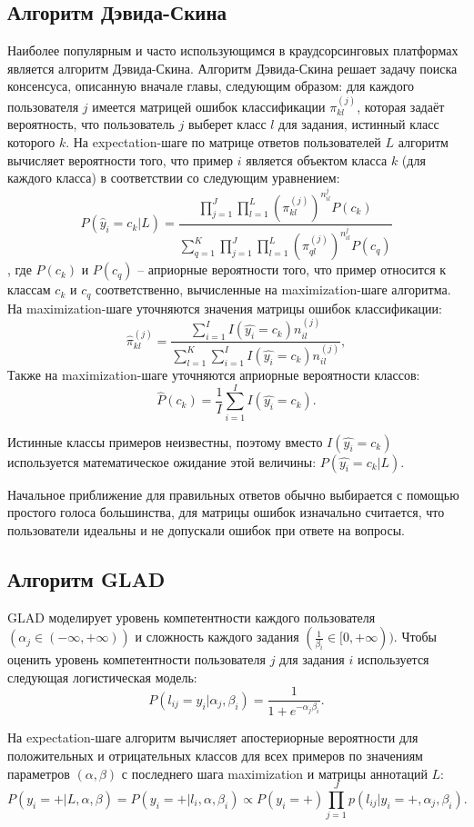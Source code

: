 \documentclass[specification,annotation,times]{itmo-student-thesis}
\begin{document}
\subsection{Алгоритм Дэвида-Скина}
Наиболее популярным и часто использующимся в краудсорсинговых платформах является алгоритм Дэвида-Скина. Алгоритм Дэвида-Скина решает задачу поиска консенсуса, описанную вначале главы, следующим образом: для каждого пользователя $j$ имеется матрицей ошибок классификации $\pi^{(j)}_{kl}$, которая задаёт вероятность, что пользователь $j$ выберет класс $l$ для задания, истинный класс которого $k$. На expectation-шаге по матрице ответов пользователей $L$ алгоритм вычисляет вероятности того, что пример $i$ является объектом класса $k$ (для каждого класса) в соответствии со следующим уравнением:
\[P(\hat{y}_{i}=c_{k}|L)=\frac{\prod_{j=1}^{J}\prod_{l=1}^{L}(\pi^{(j)}_{kl})^{n_{il}^{j}}P(c_{k})}{\sum_{q=1}^{K}\prod_{j=1}^{J}\prod_{l=1}^{L}(\pi^{(j)}_{ql})^{n_{il}^{j}}P(c_{q})}\]
, где $P(c_{k})$ и $P(c_{q})$ -- априорные вероятности того, что пример относится к классам $c_{k}$ и $c_{q}$ соответственно, вычисленные на maximization-шаге алгоритма. На maximization-шаге уточняются значения матрицы ошибок классификации:
\[\hat{\pi}_{kl}^{(j)}=\frac{\sum_{i=1}^{I}I(\hat{y_{i}}=c_{k})n_{il}^{(j)}}{\sum_{l=1}^{K}\sum_{i=1}^{I}I(\hat{y_{i}}=c_{k})n_{il}^{(j)}},\]
Также на maximization-шаге уточняются априорные вероятности классов:
\[\hat{P}(c_{k})=\frac{1}{I}\sum_{i=1}^{I}I(\hat{y_{i}}=c_{k}).\]

Истинные классы примеров неизвестны, поэтому вместо $I(\hat{y_{i}}=c_{k})$ используется математическое ожидание этой величины: $P(\hat{y_{i}}=c_{k}|L).$

Начальное приближение для правильных ответов обычно выбирается с помощью простого голоса большинства, для матрицы ошибок изначально считается, что пользователи идеальны и не допускали ошибок при ответе на вопросы. 

\subsection{Алгоритм GLAD}
GLAD моделирует уровень компетентности каждого пользователя $(\alpha_{j}\in(-\infty, +\infty))$ и сложность каждого задания $(\frac{1}{\beta_{i}}\in [0,+\infty))$. Чтобы оценить уровень компетентности пользователя $j$ для задания $i$ используется следующая логистическая модель:
\[P(l_{ij}=y_{i}|\alpha_{j},\beta_{i})=\frac{1}{1+e^{-\alpha_{j}\beta_{i}}}.\]

На expectation-шаге алгоритм вычисляет апостериорные вероятности для положительных и отрицательных классов для всех примеров по значениям параметров $(\alpha, \beta)$ с последнего шага maximization и матрицы аннотаций $L$:
\[P(y_{i}=+|L,\alpha,\beta)=P(y_{i}=+|l_{i},\alpha,\beta_{i})\propto P(y_{i}=+)\prod_{j=1}^{J}p(l_{ij}|y_{i}=+,\alpha_{j},\beta_{i}).\]
\end{document}
